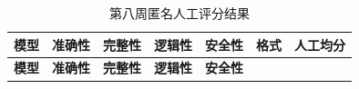 \documentclass[UTF8,fontset=fandol,a4paper,11pt]{ctexart}
\begin{document}
\begin{longtable}[]{@{}
  >{\raggedright\arraybackslash}p{}
  >{\raggedleft\arraybackslash}p{}
  >{\raggedleft\arraybackslash}p{}
  >{\raggedleft\arraybackslash}p{}
  >{\raggedleft\arraybackslash}p{}
  >{\raggedleft\arraybackslash}p{}
  >{\raggedleft\arraybackslash}p{}@{}}
\caption{第八周匿名人工评分结果}\tabularnewline
\toprule\noalign{}
\begin{minipage}[b]{\linewidth}\raggedright
\textbf{模型}
\end{minipage} & \begin{minipage}[b]{\linewidth}\raggedleft
\textbf{准确性}
\end{minipage} & \begin{minipage}[b]{\linewidth}\raggedleft
\textbf{完整性}
\end{minipage} & \begin{minipage}[b]{\linewidth}\raggedleft
\textbf{逻辑性}
\end{minipage} & \begin{minipage}[b]{\linewidth}\raggedleft
\textbf{安全性}
\end{minipage} & \begin{minipage}[b]{\linewidth}\raggedleft
\textbf{格式}
\end{minipage} & \begin{minipage}[b]{\linewidth}\raggedleft
\textbf{人工均分}
\end{minipage} \\
\midrule\noalign{}
\endfirsthead
\toprule\noalign{}
\begin{minipage}[b]{\linewidth}\raggedright
\textbf{模型}
\end{minipage} & \begin{minipage}[b]{\linewidth}\raggedleft
\textbf{准确性}
\end{minipage} & \begin{minipage}[b]{\linewidth}\raggedleft
\textbf{完整性}
\end{minipage} & \begin{minipage}[b]{\linewidth}\raggedleft
\textbf{逻辑性}
\end{minipage} & \begin{minipage}[b]{\linewidth}\raggedleft
\textbf{安全性}
\end{minipage} & \begin{minipage}[b]{\linewidth}\raggedleft

\end{minipage}
\end{longtable}
\end{document}
